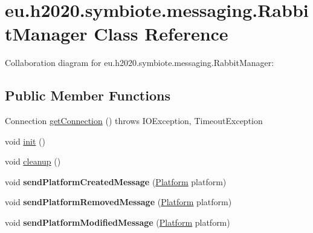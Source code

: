\hypertarget{classeu_1_1h2020_1_1symbiote_1_1messaging_1_1RabbitManager}{}\section{eu.\+h2020.\+symbiote.\+messaging.\+Rabbit\+Manager Class Reference}
\label{classeu_1_1h2020_1_1symbiote_1_1messaging_1_1RabbitManager}


Collaboration diagram for eu.\+h2020.\+symbiote.\+messaging.\+Rabbit\+Manager\+:
\subsection*{Public Member Functions}
\begin{DoxyCompactItemize}
\item 
Connection \hyperlink{classeu_1_1h2020_1_1symbiote_1_1messaging_1_1RabbitManager_ac6037e07ab7703c98c8a880a1ea5f5cd}{get\+Connection} ()  throws I\+O\+Exception, Timeout\+Exception 
\item 
void \hyperlink{classeu_1_1h2020_1_1symbiote_1_1messaging_1_1RabbitManager_ae6688b10d5858345271d21eda576036c}{init} ()
\item 
void \hyperlink{classeu_1_1h2020_1_1symbiote_1_1messaging_1_1RabbitManager_abf294e221b0bbfc0faa81d38fcec50cd}{cleanup} ()
\item 
void {\bfseries send\+Platform\+Created\+Message} (\hyperlink{classeu_1_1h2020_1_1symbiote_1_1model_1_1Platform}{Platform} platform)\hypertarget{classeu_1_1h2020_1_1symbiote_1_1messaging_1_1RabbitManager_ad0733a08e8a207dac36c8ae6a86dfe7e}{}\label{classeu_1_1h2020_1_1symbiote_1_1messaging_1_1RabbitManager_ad0733a08e8a207dac36c8ae6a86dfe7e}

\item 
void {\bfseries send\+Platform\+Removed\+Message} (\hyperlink{classeu_1_1h2020_1_1symbiote_1_1model_1_1Platform}{Platform} platform)\hypertarget{classeu_1_1h2020_1_1symbiote_1_1messaging_1_1RabbitManager_af0a5271ea2607bc84b77f81d70e6dcd7}{}\label{classeu_1_1h2020_1_1symbiote_1_1messaging_1_1RabbitManager_af0a5271ea2607bc84b77f81d70e6dcd7}

\item 
void {\bfseries send\+Platform\+Modified\+Message} (\hyperlink{classeu_1_1h2020_1_1symbiote_1_1model_1_1Platform}{Platform} platform)\hypertarget{classeu_1_1h2020_1_1symbiote_1_1messaging_1_1RabbitManager_ac241cd7e1ec4b33aa0a907b86eecb354}{}\label{classeu_1_1h2020_1_1symbiote_1_1messaging_1_1RabbitManager_ac241cd7e1ec4b33aa0a907b86eecb354}


\end{DoxyCompactItemize}
